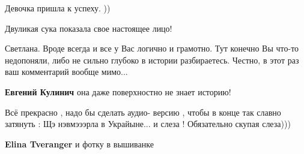 \begin{itemize}
Девочка пришла к успеху. ))

 
Двуликая сука показала свое настоящее лицо!

 

Светлана. Вроде всегда и все у Вас логично и грамотно. Тут конечно Вы что-то
недопоняли, либо не сильно глубоко в истории разбираетесь. Честно, в этот раз
ваш комментарий вообще мимо...

\begin{itemize}
 
\textbf{Евгений Кулинич} она даже поверхностно не знает историю!
\end{itemize}

 

Всё прекрасно , надо бы сделать аудио- версию , чтобы в конце так славно
затянуть : Щэ нэвмэээрла в Украйыне... и слеза ! Обязательно скупая слеза)))

\begin{itemize}
 
\textbf{Elina Tveranger} и фотку в вышиванке

 

\end{itemize}
\end{itemize}
